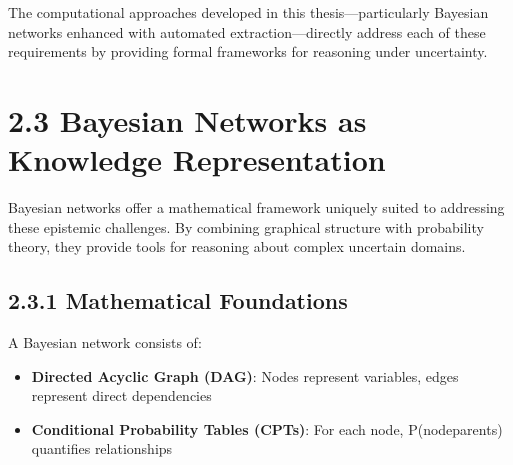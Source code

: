 \documentclass[
  11pt,
  letterpaper,
]{book}
\providecommand{\tightlist}{%
  \setlength{\itemsep}{0pt}\setlength{\parskip}{0pt}}
\begin{document}
\begin{tcolorbox}[enhanced jigsaw, toprule=.15mm, colbacktitle=quarto-callout-tip-color!10!white, opacitybacktitle=0.6, leftrule=.75mm, coltitle=black, rightrule=.15mm, opacityback=0, bottomtitle=1mm, title=\textcolor{quarto-callout-tip-color}{\faLightbulb}\hspace{0.5em}{Key Insight}, toptitle=1mm, breakable, titlerule=0mm, left=2mm, arc=.35mm, colframe=quarto-callout-tip-color-frame, bottomrule=.15mm, colback=white]

The computational approaches developed in this thesis---particularly
Bayesian networks enhanced with automated extraction---directly address
each of these requirements by providing formal frameworks for reasoning
under uncertainty.

\end{tcolorbox}

\textcite{mccaslin2024}

\textcite{tetlock2022}

\textcite{gruetzemacher2022}

\section*{2.3 Bayesian Networks as Knowledge
Representation}\label{sec-bayesian-networks}


Bayesian networks offer a mathematical framework uniquely suited to
addressing these epistemic challenges. By combining graphical structure
with probability theory, they provide tools for reasoning about complex
uncertain domains.

\subsection*{2.3.1 Mathematical
Foundations}\label{sec-mathematical-foundations}

A Bayesian network consists of:

\begin{itemize}
\tightlist
\item
  \textbf{Directed Acyclic Graph (DAG)}: Nodes represent variables,
  edges represent direct dependencies
\item
  \textbf{Conditional Probability Tables (CPTs)}: For each node,
  P(node\textbar parents) quantifies relationships
\end{itemize}
\end{document}
